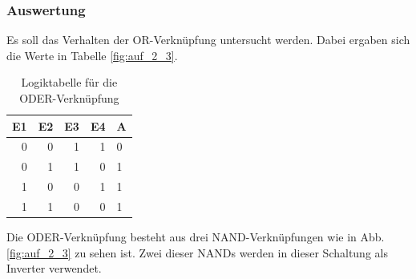 \documentclass[12pt,a4paper]{article}
\begin{document}
\subsubsection*{Auswertung}

Es soll das Verhalten der OR-Verknüpfung untersucht werden. Dabei ergaben sich die Werte in Tabelle \ref{fig:auf_2_3}.

\begin{table}[H]
\begin{center}
\begin{tabular}{r|r|r|r|l}

\multicolumn{1}{l|}{E1} & \multicolumn{1}{l|}{E2} & \multicolumn{1}{l|}{E3} & \multicolumn{1}{l|}{E4} & A \\ \hline \hline
0 & 0 & 1 & 1 & 0 \\ 
0 & 1 & 1 & 0 & 1 \\ 
1 & 0 & 0 & 1 & 1 \\ 
1 & 1 & 0 & 0 & 1 \\ 
\end{tabular}
\end{center}
\caption{Logiktabelle für die ODER-Verknüpfung}
\label{tab:2_3}
\end{table}

Die ODER-Verknüpfung besteht aus drei NAND-Verknüpfungen wie in Abb. \ref{fig:auf_2_3} zu sehen ist. Zwei dieser NANDs werden in dieser Schaltung als Inverter verwendet.
\end{document}
